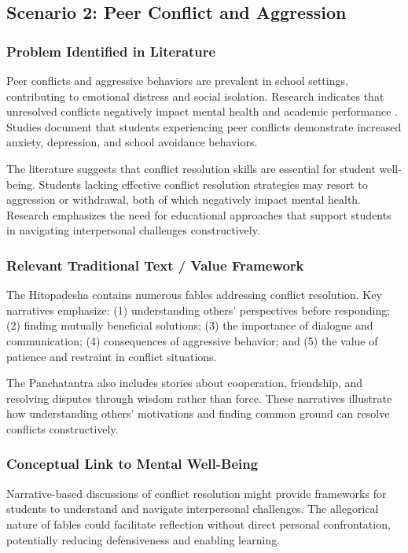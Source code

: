 \documentclass[12pt,a4paper,twocolumn]{article}
\begin{document}
\subsection{Scenario 2: Peer Conflict and Aggression}

\subsubsection{Problem Identified in Literature}

Peer conflicts and aggressive behaviors are prevalent in school settings, contributing to emotional distress and social isolation. Research indicates that unresolved conflicts negatively impact mental health and academic performance \citep{Joshi2021}. Studies document that students experiencing peer conflicts demonstrate increased anxiety, depression, and school avoidance behaviors.

The literature suggests that conflict resolution skills are essential for student well-being. Students lacking effective conflict resolution strategies may resort to aggression or withdrawal, both of which negatively impact mental health. Research emphasizes the need for educational approaches that support students in navigating interpersonal challenges constructively.

\subsubsection{Relevant Traditional Text / Value Framework}

The Hitopadesha contains numerous fables addressing conflict resolution. Key narratives emphasize: (1) understanding others' perspectives before responding; (2) finding mutually beneficial solutions; (3) the importance of dialogue and communication; (4) consequences of aggressive behavior; and (5) the value of patience and restraint in conflict situations.

The Panchatantra also includes stories about cooperation, friendship, and resolving disputes through wisdom rather than force. These narratives illustrate how understanding others' motivations and finding common ground can resolve conflicts constructively.

\subsubsection{Conceptual Link to Mental Well-Being}

Narrative-based discussions of conflict resolution might provide frameworks for students to understand and navigate interpersonal challenges. The allegorical nature of fables could facilitate reflection without direct personal confrontation, potentially reducing defensiveness and enabling learning.
\end{document}
